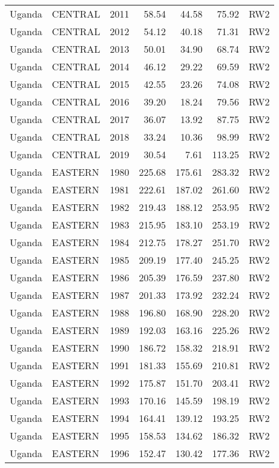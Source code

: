 \begin{longtable}{lllrrrl}
  Uganda & CENTRAL & 2011 & 58.54 & 44.58 & 75.92 & RW2 \\ 
  Uganda & CENTRAL & 2012 & 54.12 & 40.18 & 71.31 & RW2 \\ 
  Uganda & CENTRAL & 2013 & 50.01 & 34.90 & 68.74 & RW2 \\ 
  Uganda & CENTRAL & 2014 & 46.12 & 29.22 & 69.59 & RW2 \\ 
  Uganda & CENTRAL & 2015 & 42.55 & 23.26 & 74.08 & RW2 \\ 
  Uganda & CENTRAL & 2016 & 39.20 & 18.24 & 79.56 & RW2 \\ 
  Uganda & CENTRAL & 2017 & 36.07 & 13.92 & 87.75 & RW2 \\ 
  Uganda & CENTRAL & 2018 & 33.24 & 10.36 & 98.99 & RW2 \\ 
  Uganda & CENTRAL & 2019 & 30.54 & 7.61 & 113.25 & RW2 \\ 
  Uganda & EASTERN & 1980 & 225.68 & 175.61 & 283.32 & RW2 \\ 
  Uganda & EASTERN & 1981 & 222.61 & 187.02 & 261.60 & RW2 \\ 
  Uganda & EASTERN & 1982 & 219.43 & 188.12 & 253.95 & RW2 \\ 
  Uganda & EASTERN & 1983 & 215.95 & 183.10 & 253.19 & RW2 \\ 
  Uganda & EASTERN & 1984 & 212.75 & 178.27 & 251.70 & RW2 \\ 
  Uganda & EASTERN & 1985 & 209.19 & 177.40 & 245.25 & RW2 \\ 
  Uganda & EASTERN & 1986 & 205.39 & 176.59 & 237.80 & RW2 \\ 
  Uganda & EASTERN & 1987 & 201.33 & 173.92 & 232.24 & RW2 \\ 
  Uganda & EASTERN & 1988 & 196.80 & 168.90 & 228.20 & RW2 \\ 
  Uganda & EASTERN & 1989 & 192.03 & 163.16 & 225.26 & RW2 \\ 
  Uganda & EASTERN & 1990 & 186.72 & 158.32 & 218.91 & RW2 \\ 
  Uganda & EASTERN & 1991 & 181.33 & 155.69 & 210.81 & RW2 \\ 
  Uganda & EASTERN & 1992 & 175.87 & 151.70 & 203.41 & RW2 \\ 
  Uganda & EASTERN & 1993 & 170.16 & 145.59 & 198.19 & RW2 \\ 
  Uganda & EASTERN & 1994 & 164.41 & 139.12 & 193.25 & RW2 \\ 
  Uganda & EASTERN & 1995 & 158.53 & 134.62 & 186.32 & RW2 \\ 
  Uganda & EASTERN & 1996 & 152.47 & 130.42 & 177.36 & RW2 \\ 

\end{longtable}
